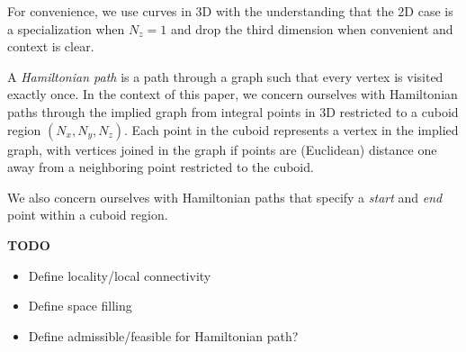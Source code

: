 For convenience, we use curves in 3D with the understanding that the 2D case is a specialization
when $N_z = 1$ and drop the third dimension when convenient and context is clear.

A \textit{Hamiltonian path} is a path through a graph such that every vertex is visited exactly once.
In the context of this paper, we concern ourselves with Hamiltonian paths through the implied
graph from integral points in 3D restricted to a cuboid region $(N_x, N_y, N_z)$.
Each point in the cuboid represents a vertex in the implied graph, with vertices joined in the graph
if points are (Euclidean) distance one away from a neighboring point restricted to the cuboid.

We also concern ourselves with Hamiltonian paths that specify a \textit{start} and \textit{end} point within
a cuboid region.


\textbf{TODO}

\begin{itemize}
  \item Define locality/local connectivity
  \item Define space filling
  \item Define admissible/feasible for Hamiltonian path?
\end{itemize}


